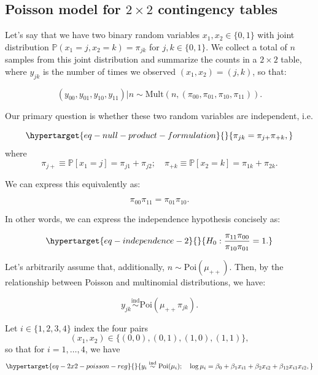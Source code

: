 \documentclass[
  11pt,
  letterpaper,
  oneside]{book}
\theoremstyle{plain}
\theoremstyle{plain}
\theoremstyle{definition}
\theoremstyle{definition}
\theoremstyle{plain}
\theoremstyle{remark}
\begin{document}
\hypertarget{sec-poisson-2x2}{%
\subsection{\texorpdfstring{Poisson model for \(2 \times 2\) contingency
tables}{Poisson model for 2 \textbackslash times 2 contingency tables}}\label{sec-poisson-2x2}}

Let's say that we have two binary random variables
\(x_1, x_2 \in \{0,1\}\) with joint distribution
\(\mathbb{P}(x_1 = j, x_2 = k) = \pi_{jk}\) for \(j,k \in \{0,1\}\). We
collect a total of \(n\) samples from this joint distribution and
summarize the counts in a \(2 \times 2\) table, where \(y_{jk}\) is the
number of times we observed \((x_1, x_2) = (j,k)\), so that:

\[
(y_{00}, y_{01}, y_{10}, y_{11})|n \sim \text{Mult}(n, (\pi_{00}, \pi_{01}, \pi_{10}, \pi_{11})).
\]

Our primary question is whether these two random variables are
independent, i.e.

\begin{equation}\protect\hypertarget{eq-null-product-formulation}{}{
\pi_{jk} = \pi_{j+}\pi_{+k},
}\label{eq-null-product-formulation}\end{equation} where \[
\pi_{j+} \equiv \mathbb{P}[x_1 = j] = \pi_{j1} + \pi_{j2}; \quad \pi_{+k} \equiv \mathbb{P}[x_2 = k] = \pi_{1k} + \pi_{2k}.
\]

We can express this equivalently as:

\[
\pi_{00}\pi_{11} = \pi_{01}\pi_{10}.
\]

In other words, we can express the independence hypothesis concisely as:

\begin{equation}\protect\hypertarget{eq-independence-2}{}{
H_0: \frac{\pi_{11}\pi_{00}}{\pi_{10}\pi_{01}} = 1.
}\label{eq-independence-2}\end{equation}

Let's arbitrarily assume that, additionally,
\(n \sim \text{Poi}(\mu_{++})\). Then, by the relationship between
Poisson and multinomial distributions, we have:

\[
y_{jk} \overset{\text{ind}} \sim \text{Poi}(\mu_{++}\pi_{jk}).
\]

Let \(i \in \{1,2,3,4\}\) index the four pairs \[
(x_1, x_2) \in \{(0,0), (0,1), (1,0), (1,1)\},
\] so that for \(i = 1, \dots, 4\), we have
\begin{equation}\protect\hypertarget{eq-2x2-poisson-reg}{}{
y_i \overset{\text{ind}}\sim \text{Poi}(\mu_i); \quad \log \mu_i = \beta_0 + \beta_1 x_{i1} + \beta_2 x_{i2} + \beta_{12}x_{i1} x_{i2},
}\label{eq-2x2-poisson-reg}\end{equation}
\end{document}
